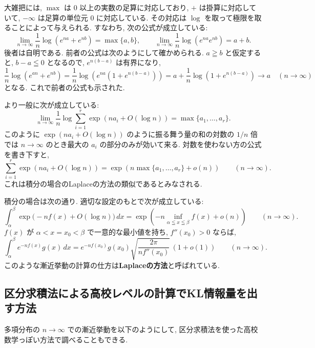 \documentclass[12pt,twoside]{jarticle}
\theoremstyle{jplain}
\theoremstyle{jplain}
\theoremstyle{jplain}
\numberwithin{theorem}{section}
\numberwithin{equation}{section}
\numberwithin{figure}{section}
\numberwithin{table}{section}
\begin{document}
大雑把には, $\max$ は $0$ 以上の実数の足算に対応しており, 
$+$ は掛算に対応していて, $-\infty$ は足算の単位元 $0$ に対応している.
その対応は $\log$ を取って極限を取ることによって与えられる.
すなわち, 次の公式が成立している:
\[
\lim_{n\to\infty}\frac{1}{n}\log(e^{na}+e^{nb})=\max\{a,b\}, \qquad
\lim_{n\to\infty}\frac{1}{n}\log(e^{na}e^{nb})=a+b.
\]
後者は自明である.
前者の公式は次のようにして確かめられる. 
$a\geqq b$ と仮定すると, $b-a\leqq 0$ となるので, 
$e^{n(b-a)}$ は有界になり, 
\[
\frac{1}{n}\log(e^{an}+e^{nb})
=\frac{1}{n}\log\left(e^{na}\left(1+e^{n(b-a)}\right)\right)
=a+\frac{1}{n}\log\left(1+e^{n(b-a)}\right)
\to a
\quad (n\to\infty)
\]
となる. これで前者の公式も示された.

より一般に次が成立している:
\[
\lim_{n\to\infty}\frac{1}{n}\log\sum_{i=1}^r \exp(na_i+O(\log n)) 
= \max\{a_1,\ldots,a_r\}.
\]
このように $\exp(na_i+O(\log n))$ のように振る舞う量の和の対数の $1/n$ 倍では
$n\to\infty$ のとき最大の $a_i$ の部分のみが効いて来る.
対数を使わない方の公式を書き下すと, 
\[
\sum_{i=1}^r \exp(na_i+O(\log n))
=
\exp(n\max\{a_1,\ldots,a_r\}+o(n))
\qquad
(n\to\infty).
\]
これは積分の場合のLaplaceの方法の類似であるとみなされる.

積分の場合は次の通り.
適切な設定のもとで次が成立している:
\[
\int_\alpha^\beta \exp\biggl(-nf(x)+O(\log n)\biggr)\,dx
=
\exp\left(-n\inf_{\alpha\leqq x\leqq\beta} f(x) + o(n)\right)
\qquad
(n\to\infty).
\]
$f(x)$ が $\alpha<x=x_0<\beta$ で一意的な最小値を持ち, 
$f''(x_0)>0$ ならば,
\[
\int_\alpha^\beta e^{-nf(x)}g(x)\,dx
=
e^{-nf(x_0)}g(x_0)\sqrt{\frac{2\pi}{n f''(x_0)}}\,(1+o(1))
\qquad
(n\to\infty).
\]
このような漸近挙動の計算の仕方は{\bf Laplaceの方法}と呼ばれている.


\subsection{区分求積法による高校レベルの計算でKL情報量を出す方法}
\label{sec:quadrature-by-parts}

多項分布の $n\to\infty$ での漸近挙動を以下のようにして, 
区分求積法を使った高校数学っぽい方法で調べることもできる.
\end{document}
